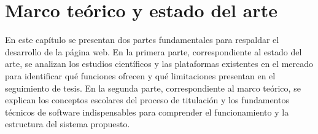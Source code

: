 \chapter{Marco teórico y estado del arte}
\label{cap:marco_teorico_estado_arte}

En este capítulo se presentan dos partes fundamentales para respaldar el desarrollo de la página web. En la primera parte, correspondiente al estado del arte, se analizan los estudios científicos y las plataformas existentes en el mercado para identificar qué funciones ofrecen y qué limitaciones presentan en el seguimiento de tesis. En la segunda parte, correspondiente al marco teórico, se explican los conceptos escolares del proceso de titulación y los fundamentos técnicos de software indispensables para comprender el funcionamiento y la estructura del sistema propuesto.


